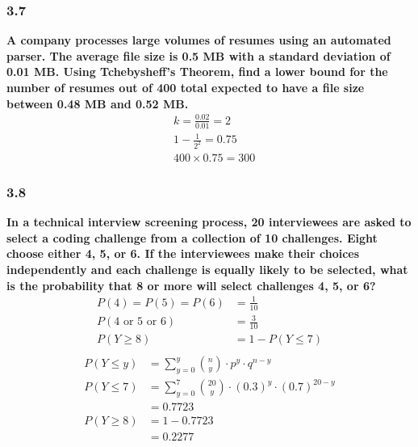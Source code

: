 \documentclass[
	a4paper, %
	10pt, %
	unnumberedsections, %
	twoside, %
]{LTJournalArticle}
\begin{document}
\subsubsection{3.7}
\textbf{A company processes large volumes of resumes using an automated parser. The average file size is 0.5 MB with a standard deviation of 0.01 MB. Using Tchebysheff's Theorem, find a lower bound for the number of resumes out of 400 total expected to have a file size between 0.48 MB and 0.52 MB.}
\begin{equation*}
    \begin{aligned}
        &k = \frac{0.02}{0.01} = 2 \\
        &1 - \frac{1}{2^2} = 0.75 \\
        &400 \times 0.75 = 300
    \end{aligned}
\end{equation*}
\vspace*{100pt}\noindent
\subsubsection{3.8}
\textbf{In a technical interview screening process, 20 interviewees are asked to select a coding challenge from a collection of 10 challenges. Eight choose either 4, 5, or 6. If the interviewees make their choices independently and each challenge is equally likely to be selected, what is the probability that 8 or more will select challenges 4, 5, or 6?}
\begin{equation*}
    \begin{aligned}
        P(4) = P(5) = P(6) &= \frac{1}{10} \\
        P(4 \text{ or } 5 \text{ or } 6) &= \frac{3}{10} \\
        P(Y \ge 8) &= 1 - P(Y \le 7) \\
    \end{aligned}
\end{equation*}
\begin{equation*}
    \begin{aligned}
        P(Y \le y) &= \sum_{y = 0}^y \binom{n}{y} \cdot p^y \cdot q^{n-y} \\
        P(Y \le 7) &= \sum_{y = 0}^7 \binom{20}{y} \cdot (0.3)^y \cdot (0.7)^{20 - y} \\
        &= 0.7723 \\
        P(Y \ge 8) &= 1 - 0.7723 \\
        &= 0.2277
    \end{aligned}
\end{equation*}
\vspace*{1pt}\noindent
\end{document}
